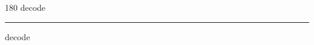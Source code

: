 
\begin{frame}
\begin{center}
\begin{turn}{180}
{\fontsize{2.5cm}{1em}\selectfont decode}
\end{turn}
\vspace{1em}\par  
\hrule
\vspace{1em}\par  
{\fontsize{2.5cm}{1em}\selectfont decode}
\end{center}
\end{frame}

